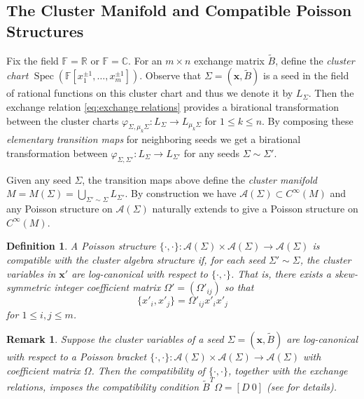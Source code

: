 \documentclass{amsart}
\newtheorem{definition}[theorem]{Definition}
\newtheorem{remark}[theorem]{Remark}
\newcommand{\bfx}{\mathbf{x}}
\newcommand{\cA}{\mathcal{A}}
\newcommand{\CC}{\mathbb{C}}
\newcommand{\FF}{\mathbb{F}}
\newcommand{\RR}{\mathbb{R}}
\newcommand{\Spec}{\operatorname{Spec}}
\begin{document}
\subsection{The Cluster Manifold and Compatible Poisson Structures}
Fix the field $\FF=\RR$ or $\FF=\CC$.
For an $m\times n$ exchange matrix $\tilde B$, define the \emph{cluster chart} $\Spec(\FF[x_1^{\pm1},\ldots,x_m^{\pm1}])$.
Observe that $\Sigma=(\bfx,\tilde B)$ is a seed in the field of rational functions on this cluster chart and thus we denote it by $L_\Sigma$.
Then the exchange relation \eqref{eq:exchange relations} provides a birational transformation between the cluster charts $\varphi_{\Sigma,\mu_k\Sigma}:L_\Sigma\to L_{\mu_k\Sigma}$ for $1\le k\le n$.
By composing these \emph{elementary transition maps} for neighboring seeds we get a birational transformation between $\varphi_{\Sigma,\Sigma'}:L_\Sigma\to L_{\Sigma'}$ for any seeds $\Sigma\sim\Sigma'$.

Given any seed $\Sigma$, the transition maps above define the \emph{cluster manifold} $M=M(\Sigma)=\bigcup\limits_{\Sigma'\sim\Sigma}L_{\Sigma'}$.
By construction we have $\cA(\Sigma)\subset C^\infty(M)$ and any Poisson structure on $\cA(\Sigma)$ naturally extends to give a Poisson structure on $C^\infty(M)$.

\begin{definition}
  A Poisson structure $\{\cdot,\cdot\}:\cA(\Sigma)\times\cA(\Sigma)\to\cA(\Sigma)$ is \emph{compatible} with the cluster algebra structure if, for each seed $\Sigma'\sim\Sigma$, the cluster variables in $\bfx'$ are \emph{log-canonical} with respect to $\{\cdot,\cdot\}$.
  That is, there exists a skew-symmetric integer \emph{coefficient matrix} $\Omega'=(\Omega'_{ij})$ so that 
  \begin{equation}
    \label{eq:log-canonical bracket}
    \{x'_i,x'_j\}=\Omega'_{ij}x'_ix'_j
  \end{equation}
  for $1\le i,j\le m$.
\end{definition}
\begin{remark}
  Suppose the cluster variables of a seed $\Sigma=(\bfx,\tilde B)$ are log-canonical with respect to a Poisson bracket $\{\cdot,\cdot\}:\cA(\Sigma)\times\cA(\Sigma)\to\cA(\Sigma)$ with coefficient matrix $\Omega$.
  Then the compatibility of $\{\cdot,\cdot\}$, together with the exchange relations, imposes the compatibility condition $\tilde B^T\Omega=[D\ 0]$ (see \cite{berenstein-zelevinsky,gekhtman-shapiro-vainshtein} for details).
\end{remark}
\end{document}
